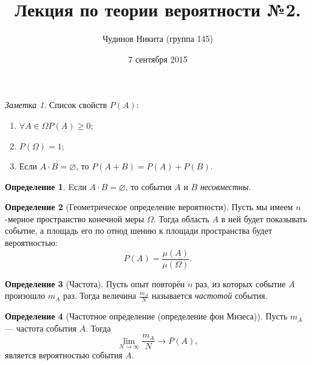 \documentclass[a4paper,12pt]{article}
\let\emptyset\varnothing
\theoremstyle{remark}
\newtheorem*{note}{Заметка}
\theoremstyle{definition}
\newtheorem{definition}{Определение}
\begin{document}
\sloppy
\author{Чудинов Никита (группа 145)}
\date{7 сентября 2015}
\title{\vspace{-2.0cm}Лекция по теории вероятности №2.}
\frenchspacing

\maketitle

\begin{note}
	Список свойств \(P(A)\):
	\begin{enumerate}
		\item \(\forall A \in \Omega P(A) \geqslant 0\);
	    \item \(P(\Omega) = 1\);
	    \item Если \(A \cdot B = \emptyset\), то \(P(A + B) = P(A) + P(B)\).
	\end{enumerate}
\end{note}

\begin{definition}
	Eсли \(A \cdot B = \emptyset\), то события \(A\) и \(B\) \emph{несовместны}.
\end{definition}


\begin{definition}[Геометрическое определение вероятности]
	Пусть мы имеем \(n\)-мерное пространство конечной меры \(\Omega\). Тогда область \(A\) в ней будет показывать событие, а площадь его по отнод шению к площади пространства будет вероятностью:
	\begin{equation*}
		P(A) = \frac{\mu(A)}{\mu(\Omega)}.
	\end{equation*}
\end{definition}

\begin{definition}[Частота]
	Пусть опыт повторён \(n\) раз, из которых событие \(A\) произошло \(m_A\) раз. Тогда величина \(\frac{m_A}{N}\) называется \emph{частотой} события.
\end{definition}


\begin{definition}[Частотное определение (определение фон Мизеса)]
	Пусть \(m_A\) --- частота события \(A\). Тогда
	\begin{equation*}
		\lim_{N \rightarrow \infty} \frac{m_A}{N} \rightarrow P(A),
	\end{equation*}
	является вероятностью события \(A\).
\end{definition}
\end{document}
